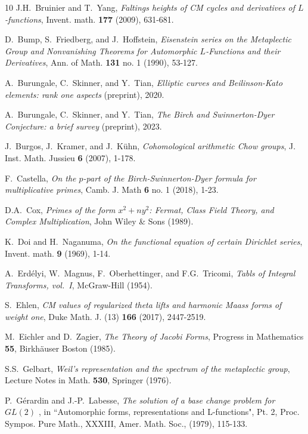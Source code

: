\documentclass{amsart}
\theoremstyle{definition}
\theoremstyle{definition}
\theoremstyle{definition}
\begin{document}
\begin{thebibliography}{10}
 J.H.~Bruinier and T.~Yang, {\it{Faltings heights of CM cycles and derivatives of $L$-functions}}, Invent. math. {\bf{177}} (2009), 631-681.

 D.~Bump, S.~Friedberg, and J.~Hoffstein, {\it{Eisenstein series on the Metaplectic Group and Nonvanishing Theorems for Automorphic 
$L$-Functions and their Derivatives}}, Ann. of Math. {\bf{131}} no. 1 (1990), 53-127.

 A.~Burungale, C.~Skinner, and Y.~Tian, {\it{Elliptic curves and Beilinson-Kato elements: rank one aspects}} (preprint), 2020.

 A.~Burungale, C.~Skinner, and Y.~Tian, {\it{The Birch and Swinnerton-Dyer Conjecture: a brief survey}} (preprint), 2023.

 J.~Burgos, J.~Kramer, and J.~K\"uhn, {\it{Cohomological arithmetic Chow groups}}, J. Inst. Math. Jussieu {\bf{6}} (2007), 1-178.

 F.~Castella, {\it{On the $p$-part of the Birch-Swinnerton-Dyer formula for multiplicative primes}}, Camb. J. Math {\bf{6}} no. 1 (2018), 1-23.

 D.A.~Cox, {\it{Primes of the form $x^2 + ny^2$: Fermat, Class Field Theory, and Complex Multiplication}}, John Wiley \& Sons (1989).

 K.~Doi and H.~Naganuma, {\it{On the functional equation of certain Dirichlet series}}, Invent. math. {\bf{9}} (1969), 1-14.

 A.~Erd\'elyi, W.~Magnus, F.~Oberhettinger, and F.G.~Tricomi, {\it{Tabls of Integral Transforms, vol.~I}}, McGraw-Hill (1954).

 S.~Ehlen, {\it{CM values of regularized theta lifts and harmonic Maass forms of weight one}}, Duke Math. J. (13) {\bf{166}} (2017), 2447-2519.  

 M.~Eichler and D.~Zagier, {\it{The Theory of Jacobi Forms}}, Progress in Mathematics {\bf{55}}, Birkh\"auser Boston (1985). 

 S.S.~Gelbart, {\it{Weil's representation and the spectrum of the metaplectic group}}, 
Lecture Notes in Math. {\bf{530}}, Springer (1976).

 P.~G\'erardin and J.-P.~Labesse, {\it{The solution of a base change problem for $GL(2)$ }},
\newblock in ``Automorphic forms, representations and L-functions", Pt. 2, Proc. Sympos. Pure Math., XXXIII, Amer. Math. Soc., (1979), 115-133.


\end{thebibliography}
\end{document}
